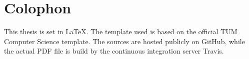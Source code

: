 

\chapter{Colophon}
This thesis is set in \LaTeX \cite{latex}. The template used is based on the official TUM Computer Science template. The sources are hosted publicly on GitHub, while the actual PDF file is build by the continuous integration server Travis.
